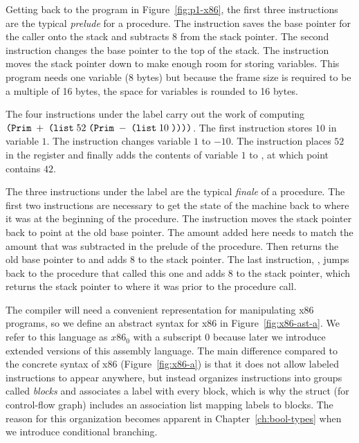 \documentclass[11pt]{book}
\begin{document}
Getting back to the program in Figure~\ref{fig:p1-x86}, the first
three instructions are the typical \emph{prelude} for a procedure.
The instruction  saves the base pointer for the
caller onto the stack and subtracts $8$ from the stack pointer. The
second instruction  changes the base pointer to
the top of the stack. The instruction  moves the
stack pointer down to make enough room for storing variables.  This
program needs one variable ($8$ bytes) but because the frame size is
required to be a multiple of 16 bytes, the space for variables is
rounded to 16 bytes.

The four instructions under the label  carry out the work
of computing $\texttt{(Prim}\;+\;\texttt{(list}\;52\;\texttt{(Prim}\;-\;\texttt{(list}\;10\;\texttt{))} \texttt{))}$. The first instruction
 stores $10$ in variable $1$. The
instruction  changes variable $1$ to $-10$. The
instruction  places $52$ in the register  and
finally  adds the contents of variable $1$ to
, at which point  contains $42$.

The three instructions under the label  are the
typical \emph{finale} of a procedure.  The first two instructions are
necessary to get the state of the machine back to where it was at the
beginning of the procedure.  The instruction 
moves the stack pointer back to point at the old base pointer. The
amount added here needs to match the amount that was subtracted in the
prelude of the procedure. Then  returns the old base
pointer to  and adds $8$ to the stack pointer.  The last
instruction, , jumps back to the procedure that called this
one and adds 8 to the stack pointer, which returns the stack pointer
to where it was prior to the procedure call.

The compiler will need a convenient representation for manipulating
x86 programs, so we define an abstract syntax for x86 in
Figure~\ref{fig:x86-ast-a}. We refer to this language as $x86_0$ with
a subscript $0$ because later we introduce extended versions of this
assembly language. The main difference compared to the concrete syntax
of x86 (Figure~\ref{fig:x86-a}) is that it does not allow labeled
instructions to appear anywhere, but instead organizes instructions
into groups called \emph{blocks} and associates a label with every
block, which is why the  struct (for control-flow graph)
includes an association list mapping labels to blocks. The reason for
this organization becomes apparent in Chapter~\ref{ch:bool-types} when
we introduce conditional branching.
\end{document}
